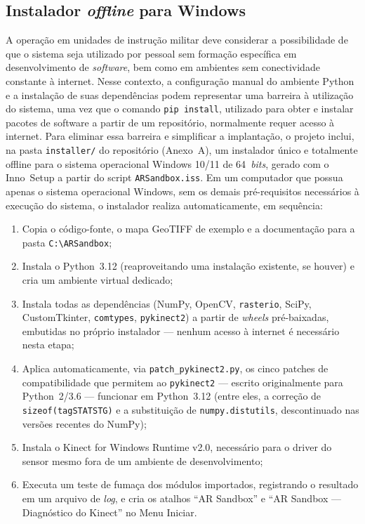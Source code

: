 \subsection{Instalador \textit{offline} para Windows}
\label{subsec:instalador}

A operação em unidades de instrução militar deve considerar a possibilidade
de que o sistema seja utilizado por pessoal sem formação específica em desenvolvimento
de \textit{software}, bem como em ambientes sem conectividade constante à internet.
Nesse contexto, a configuração manual do ambiente Python e a instalação de suas dependências
podem representar uma barreira à utilização do sistema, uma vez que o comando \texttt{pip install},
utilizado para obter e instalar pacotes de software a partir de um repositório, normalmente
requer acesso à internet. Para eliminar essa barreira e simplificar a implantação, o projeto inclui,
na pasta \texttt{installer/} do repositório (Anexo~A), um instalador único e totalmente offline para
o sistema operacional Windows 10/11 de 64~\textit{bits}, gerado com o Inno~Setup a partir do script
\texttt{ARSandbox.iss}. Em um computador que possua apenas o sistema operacional Windows, sem os demais
pré-requisitos necessários à execução do sistema, o instalador realiza automaticamente, em sequência:


\begin{enumerate}
    \item Copia o código-fonte, o mapa GeoTIFF de exemplo e a
          documentação para a pasta
          \texttt{C:\textbackslash\allowbreak ARSandbox};
    \item Instala o Python~3.12 (reaproveitando uma instalação
          existente, se houver) e cria um ambiente virtual dedicado;
    \item Instala todas as dependências (NumPy, OpenCV, \texttt{rasterio},
          SciPy, CustomTkinter, \texttt{comtypes}, \texttt{pykinect2})
          a partir de \emph{wheels} pré-baixadas, embutidas no próprio
          instalador — nenhum acesso à internet é necessário nesta
          etapa;
    \item Aplica automaticamente, via \texttt{patch\_pykinect2.py}, os
          cinco patches de compatibilidade que permitem ao
          \texttt{pykinect2} — escrito originalmente para Python~2/3.6
          — funcionar em Python~3.12 (entre eles, a correção de
          \texttt{sizeof(tagSTATSTG)} e a substituição de
          \texttt{numpy.distutils}, descontinuado nas versões recentes
          do NumPy);
    \item Instala o Kinect for Windows Runtime v2.0, necessário
          para o driver do sensor mesmo fora de um ambiente de
          desenvolvimento;
    \item Executa um teste de fumaça dos módulos importados, registrando
          o resultado em um arquivo de \emph{log}, e cria os atalhos
          ``AR Sandbox'' e ``AR Sandbox --- Diagnóstico do
          Kinect'' no Menu Iniciar.
\end{enumerate}

